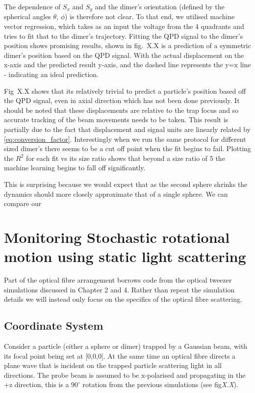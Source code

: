 The dependence of $S_x$ and $S_y$ and the dimer's orientation
(defined by the spherical angles $\theta$, $\phi$) is therefore
not clear. To that end, we utilised machine vector regression,
which takes as an input the voltage from the 4 quadrants and 
tries to fit that to the dimer's trajectory. Fitting the QPD
signal to the dimer's position shows promising results, shown in
fig.~X.X is a prediction of a symmetric dimer's position based
on the QPD signal. With the actual displacement on the x-axis 
and the predicted result y-axis, and the dashed line represents 
the y=x line - indicating an ideal prediction. 

Fig~X.X shows that its relatively trivial to predict a particle's
position based off the QPD signal, even in axial direction which
has not been done previously. It should be noted that these 
displacements are relative to the trap focus and so accurate 
tracking of the beam movements needs to be taken. This result is
partially due to the fact that displacement and signal units are
linearly related by \eqref{eq:conversion_factor}. Interestingly 
when we run the same protocol for different sized dimer's there 
seems to be a cut off point when the fit begins to fail. Plotting
the $R^2$ for each fit vs its size ratio shows that beyond a size
ratio of 5 the machine learning begins to fall off significantly. 

This is surprising because we would expect that as the second 
sphere shrinks the dynamics should more closely approximate that 
of a single sphere. We can compare our 

\section{Monitoring Stochastic rotational motion using static 
		light scattering}
Part of the optical fibre arrangement borrows code from the 
optical tweezer simulations discussed in Chapter 2 and 4. 
Rather than repeat the simulation details we will instead 
only focus on the specifics of the optical fibre scattering.

\subsection{Coordinate System}
Consider a particle (either a sphere or dimer) trapped by
a Gaussian beam, with its focal point being set at [0,0,0]. 
At the same time an optical fibre directs a plane wave that 
is incident on the trapped particle scattering light in all 
directions. The probe beam is assumed to be x-polarised and 
propagating in the +z direction, this is a $90^{\circ}$ 
rotation from the previous simulations (see fig\emph{X.X}). 

